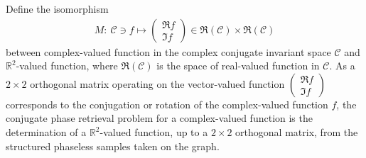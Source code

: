 \documentclass[12pt,oneside,reqno]{amsart}
\numberwithin{equation}{section}
\begin{document}
	
	Define the  isomorphism %
	\begin{align*}%
		M:\ {\mathcal C}\ni f\longmapsto \begin{pmatrix} \Re f \\ \Im f
		\end{pmatrix}\in  \Re({\mathcal C})\times \Re({\mathcal C})
	\end{align*}
	between  complex-valued function in the  complex  conjugate invariant space $\mathcal C$ 
	and ${\mathbb R}^2$-valued function, where $\Re ({\mathcal C})$ is the space of real-valued function  in ${\mathcal C}$.   As a $2\times 2$ orthogonal matrix operating on the  vector-valued function  $\begin{pmatrix} \Re f \\ \Im f
	\end{pmatrix}$ corresponds to the conjugation or rotation  of the complex-valued function $f$, 
	the  conjugate phase retrieval problem for a complex-valued function    is 
	the determination of  a ${\mathbb R}^2$-valued function, up to a $2\times 2$ orthogonal matrix, from
	the structured phaseless samples taken on the graph. 
	
		
	
	\smallskip
	
\end{document}
